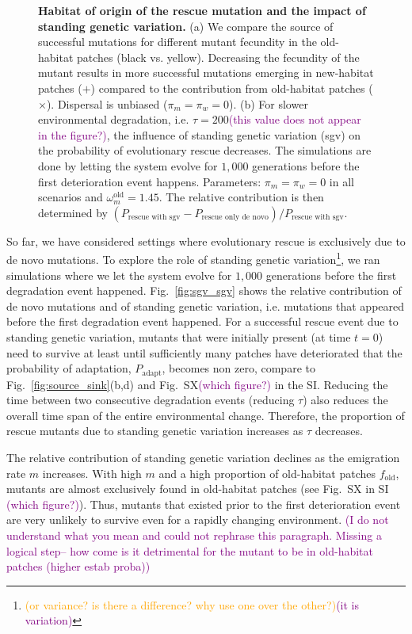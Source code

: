 \documentclass[11pt]{article}
\newcommand{\florence}[1]{\textcolor{purple}{(#1)}} %
\newcommand{\pete}[1]{\textcolor{orange}{(#1)}}
\begin{document}
\begin{figure}[t]
	\caption{\textbf{Habitat of origin of the rescue mutation and the impact of standing genetic variation.} \small (a) We compare the source of successful mutations for different mutant fecundity in the old-habitat patches  (black vs. yellow). Decreasing the fecundity of the mutant results in more successful mutations emerging in new-habitat patches ($+$) compared to the contribution from old-habitat patches ($\times$). Dispersal is unbiased ($\pi_m=\pi_w=0$). (b) For slower environmental degradation, i.e. $\tau=200$\florence{this value does not appear in the figure?}, the influence of standing genetic variation (sgv) on the probability of evolutionary rescue decreases. The simulations are done by letting the system evolve for $1,000$ generations before the first deterioration event happens. Parameters: $\pi_m=\pi_w=0$ in all scenarios and $\omega^\text{old}_m=1.45$. The relative contribution is then determined by $(P_{\text{rescue with sgv}}-P_{\text{rescue only de novo}})/P_{\text{rescue with sgv}}$.}
	\label{fig:sgv}
\end{figure}

So far, we have considered settings where evolutionary rescue is exclusively due to de novo mutations. To explore the role of standing genetic variation\footnote{\pete{or variance? is there a difference? why use one over the other?}\florence{it is variation}}, we ran simulations where we let the system evolve for $1,000$ generations before the first degradation event happened. Fig.~\ref{fig:sgv_sgv} shows the relative contribution of de novo mutations and of standing genetic variation, i.e. mutations that appeared before the first degradation event happened. For a successful rescue event due to standing genetic variation, mutants that were initially present (at time $t=0$) need to survive at least until sufficiently many patches have deteriorated that the probability of adaptation, $P_{\text{adapt}}$, becomes non zero, compare to Fig.~\ref{fig:source_sink}(b,d) and Fig.~SX\florence{which figure?} in the SI. Reducing the time between two consecutive degradation events (reducing $\tau$) also reduces the overall time span of the entire environmental change. Therefore, the proportion of rescue mutants due to standing genetic variation increases as $\tau$ decreases. 

The relative contribution of standing genetic variation declines as the emigration rate $m$ increases. With high $m$ and a high proportion of old-habitat patches $f_{\text{old}}$, mutants are  almost exclusively found in old-habitat patches (see Fig.~SX in SI \florence{which figure?}). Thus, mutants that existed prior to the first deterioration event are very unlikely to survive even for a rapidly changing environment. \florence{I do not understand what you mean and could not rephrase this paragraph. Missing a logical step-- how come is it detrimental for the mutant to be in old-habitat patches (higher estab proba)}
\end{document}
